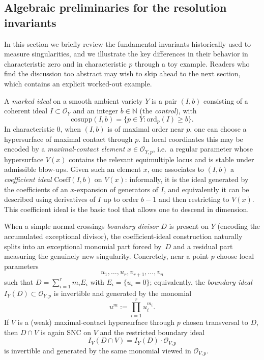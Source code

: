 \documentclass[11pt]{amsart}
\begin{document}
\subsection{Algebraic preliminaries for the resolution invariants} In this section we briefly review the fundamental invariants historically used to measure singularities, and we illustrate the key differences in their behavior in characteristic zero and in characteristic $p$ through a toy example. Readers who find the discussion too abstract may wish to skip ahead to the next section, which contains an explicit worked-out example.
 
A \emph{marked ideal} on a smooth ambient variety $Y$ is a pair $(I,b)$ consisting of a coherent ideal
$I\subset\mathcal{O}_Y$ and an integer $b\in\mathbb{N}$ (the \emph{control}), with
\[
\mathrm{cosupp}(I,b)=\{p\in Y:\mathrm{ord}_p(I)\ge b\}.
\]
In characteristic $0$, when $(I,b)$ is of maximal order near $p$, one can choose a hypersurface
of maximal contact through $p$.  In local coordinates this may be encoded by a
\emph{maximal-contact element} $x\in\mathcal{O}_{Y,p}$, i.e.\ a regular parameter whose hypersurface
$V(x)$ contains the relevant equimultiple locus and is stable under admissible blow-ups.
Given such an element $x$, one associates to $(I,b)$ a \emph{coefficient ideal}
$\mathrm{Coeff}(I,b)$ on $V(x)$: informally, it is the ideal generated by the coefficients of an
$x$-expansion of generators of $I$, and equivalently it can be described using derivatives of $I$
up to order $b-1$ and then restricting to $V(x)$.
This coefficient ideal is the basic tool that allows one to descend in dimension.

When a simple normal crossings \emph{boundary divisor} $D$ is present on $Y$ (encoding the accumulated
exceptional divisor), the coefficient-ideal construction naturally splits into an exceptional monomial
part forced by~$D$ and a residual part measuring the genuinely new singularity.
Concretely, near a point $p$ choose local parameters
\[
u_1,\dots,u_r, v_{r+1},\dots,v_n
\]
such that $D=\sum_{i=1}^r m_i E_i$ with $E_i=\{u_i=0\}$; equivalently, the \emph{boundary ideal}
$I_Y(D)\subset\mathcal{O}_{Y,p}$ is invertible and generated by the monomial
\[
u^m := \prod_{i=1}^r u_i^{m_i}.
\]
If $V$ is a (weak) maximal-contact hypersurface through $p$ chosen transversal to $D$, then
$D\cap V$ is again SNC on $V$ and the restricted boundary ideal
\begin{equation}\label{factorization}
I_V(D\cap V)=I_Y(D)\cdot\mathcal{O}_{V,p}
\end{equation}
is invertible and generated by the same monomial viewed in $\mathcal{O}_{V,p}$.
\end{document}

